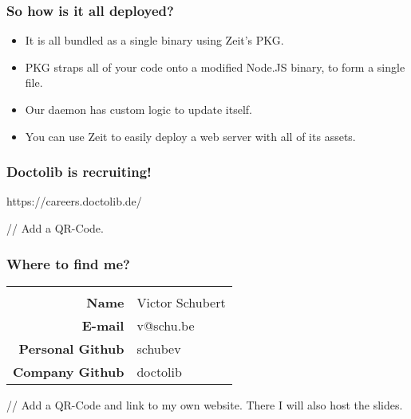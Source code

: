 \begin{frame}
	\frametitle{So how is it all deployed?}

	\begin{itemize}
		\item It is all bundled as a single binary using Zeit’s PKG.
		\item PKG straps all of your code onto a modified Node.JS binary, to form
			a single file.
		\item Our daemon has custom logic to update itself.
		\item You can use Zeit to easily deploy a web server with all of its
			assets.
	\end{itemize}
\end{frame}

\begin{frame}
	\frametitle{Doctolib is recruiting!}

	\centering

	https://careers.doctolib.de/

	// Add a QR-Code.
\end{frame}

\begin{frame}
	\frametitle{Where to find me?}

	\centering

	\begin{tabular}{>{\bfseries}rl}
		\hspace{0.5\textwidth}&\hspace{0.5\textwidth}\\
		Name & Victor Schubert \\
		E-mail & v@schu.be \\
		Personal Github & schubev \\
		Company Github & doctolib \\
	\end{tabular}

	\vspace{1em}
	// Add a QR-Code and link to my own website. There I will also host the
	slides.
\end{frame}
